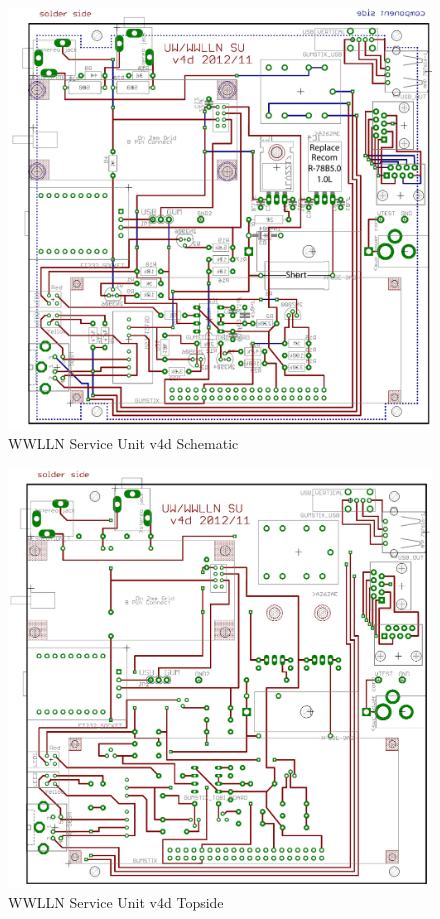 \begin{figure}[ht!]
   \centering
   \includegraphics[scale=.75]{Appendix/Figures/wwlln_SU_v4.pdf} 
   \caption{WWLLN Service Unit v4d Schematic}
   \label{su:fig:suBoard}
\end{figure}

\begin{figure}[ht!]
   \centering
   \includegraphics[scale=.75]{Appendix/Figures/wwlln_SU_v4_top.pdf} 
   \caption{WWLLN Service Unit v4d Topside}
   \label{su:fig:suTop}
\end{figure}

